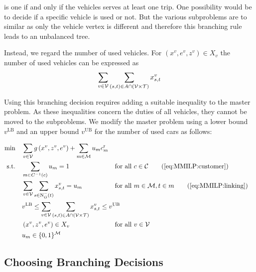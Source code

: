 is one if and only if the vehicles serves at least one trip. One possibility would be to decide if a specific vehicle is used or not. But the various subproblems are to similar as only the vehicle vertex is different and therefore this branching rule leads to an unbalanced tree.

Instead, we regard the number of used vehicles. For ${\left(x^v,e^v,z^v\right)\in X_v}$ the number of used vehicles can be expressed as
\begin{align*}
	\sum_{v\in\mathcal{V}}\sum_{(s,t)\in A\cap\left(\mathcal{V}\times\mathcal{T}\right)} x^v_{s,t}
\end{align*}

Using this branching decision requires adding a suitable inequality to the master problem. As these inequalities concern the duties of all vehicles, they cannot be moved to the subproblems. We modify the master problem using a lower bound $v^{\operatorname{LB}}$ and an upper bound $v^{\operatorname{UB}}$ for the number of used cars as follows:

\begin{align}
	\min \quad & \sum_{v\in\mathcal{V}}g\left(x^v,z^v,e^v\right) + \sum_{m\in\mathcal{M}} u_m \croute_m \nonumber \\
	\text{s.t.} \quad & \sum_{m\in C^{-1}(c)} u_m = 1 && \text{for all } c\in\mathcal{C} \tag{\ref{eq:MMILP:customer}} \\
	& \sum_{v\in\mathcal{V}}\sum_{s\in\Nin(t)}x^v_{s,t} = u_m && \text{for all } m\in\mathcal{M},t\in m \tag{\ref{eq:MMILP:linking}} \\
	& \omit\rlap{$\displaystyle{v^{\operatorname{LB}} \leq \sum_{\vinV}\sum_{(s,t)\in A\cap\left(\mathcal{V}\times\mathcal{T}\right)} x^v_{s,t} \leq v^{\operatorname{UB}}}$} \label{eq:MMILP:used_vehicles} \\
	& \left(x^v,z^v,e^v\right)\in X_v && \text{for all } v\in\mathcal{V} \nonumber \\
	& u_m\in\{0,1\}^{\mathcal{M}} \nonumber
\end{align}


\subsection{Choosing Branching Decisions}


